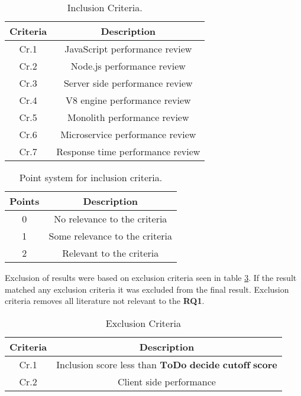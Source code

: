 \begin{table}[h!]
    \begin{tabular}{|c c|} 
        \hline
        Criteria & Description \\ [0.5ex] 
        \hline
        Cr.1 & JavaScript performance review
        \\ 
        \hline
        Cr.2 & Node.js performance review  \\ 
        \hline
        Cr.3 & Server side performance review  \\ 
        \hline
        Cr.4 & V8 engine performance review  \\ 
        \hline
        Cr.5 & Monolith performance review  \\ 
        \hline
        Cr.6 & Microservice performance review  \\ 
        \hline
        Cr.7 & Response time performance review  \\ 
        \hline
    \end{tabular}    
    \caption{Inclusion Criteria.}
    \label{table:literature:inclusionCriteria}
\end{table}

\begin{table}[h!]
    \begin{tabular}{|c c|}
        \hline
        Points & Description \\ [0.5ex] 
        \hline
         0 & No relevance to the criteria  \\ 
        \hline
         1 & Some relevance to the criteria \\ 
        \hline
        2 & Relevant to the criteria \\ 
        \hline
    \end{tabular}
    \caption{Point system for inclusion criteria.}
    \label{table:literature:pointSystem}
\end{table}

Exclusion of results were based on exclusion criteria seen in table \ref{table:literature:exclusionCriteria}.
If the result matched any exclusion criteria it was excluded from the final result.
Exclusion criteria removes all literature not relevant to the \textbf{RQ1}.

\begin{table}[h!]
    \begin{tabular}{|c c|} 
        \hline
        Criteria & Description \\ [0.5ex] 
        \hline
        Cr.1 & Inclusion score less than $\textbf{ToDo decide cutoff score}$ \\
        \hline
        Cr.2 & Client side performance  \\
        \hline
    \end{tabular}    
    \caption{Exclusion Criteria}
    \label{table:literature:exclusionCriteria}
\end{table}

